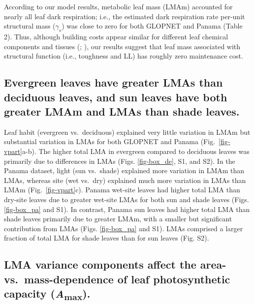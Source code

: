 \documentclass[
  12pt,
  letterpaper,
  DIV=11,
  numbers=noendperiod]{scrartcl}
\begin{document}
According to our model results, metabolic leaf mass (LMAm) accounted for
nearly all leaf dark respiration; i.e., the estimated dark respiration
rate per-unit structural mass (\(\gamma_s\)) was close to zero for both
GLOPNET and Panama (Table 2). Thus, although building costs appear
similar for different leaf chemical components and tissues
(;
), our results suggest
that leaf mass associated with structural function (i.e., toughness and
LL) has roughly zero maintenance cost.

\subsection{Evergreen leaves have greater LMAs than deciduous leaves,
and sun leaves have both greater LMAm and LMAs than shade
leaves.}\label{evergreen-leaves-have-greater-lmas-than-deciduous-leaves-and-sun-leaves-have-both-greater-lmam-and-lmas-than-shade-leaves.}

Leaf habit (evergreen vs.~deciduous) explained very little variation in
LMAm but substantial variation in LMAs for both GLOPNET and Panama
(Fig.~\ref{fig-vpart}a-b). The higher total LMA in evergreen compared to
deciduous leaves was primarily due to differences in LMAs (Figs.
\ref{fig-box_de}, S1, and S2). In the Panama dataset, light (sun
vs.~shade) explained more variation in LMAm than LMAs, whereas site (wet
vs.~dry) explained much more variation in LMAs than LMAm
(Fig.~\ref{fig-vpart}c). Panama wet-site leaves had higher total LMA
than dry-site leaves due to greater wet-site LMAs for both sun and shade
leaves (Figs. \ref{fig-box_pa} and S1). In contrast, Panama sun leaves
had higher total LMA than shade leaves primarily due to greater LMAm,
with a smaller but significant contribution from LMAs (Figs.
\ref{fig-box_pa} and S1). LMAs comprised a larger fraction of total LMA
for shade leaves than for sun leaves (Fig. S2).

\subsection{\texorpdfstring{LMA variance components affect the area-
vs.~mass-dependence of leaf photosynthetic capacity
(\emph{A}\textsubscript{max}).}{LMA variance components affect the area- vs.~mass-dependence of leaf photosynthetic capacity (Amax).}}\label{lma-variance-components-affect-the-area--vs.-mass-dependence-of-leaf-photosynthetic-capacity-amax.}
\end{document}
